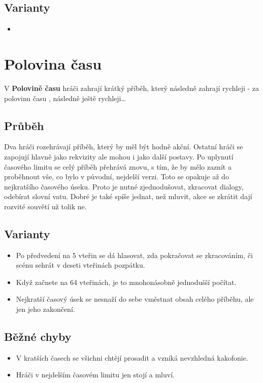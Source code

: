 \documentclass[main.tex]{subfiles}
\begin{document}
\subsection{Varianty} \begin{itemize}
\item {}
\end{itemize}
 
 
 
 
 
\needspace{5cm} \section{Polovina času} \label{polovina času}  
 
V \textbf{Polovině času}{} hráči zahrají krátký příběh, který následně zahrají rychleji -  za polovinu času , následně ještě rychleji… 
 
\subsection{ Průběh } Dva hráči rozehrávají příběh, který by měl být hodně akční. Ostatní hráči se zapojují hlavně jako rekvizity ale mohou i jako další postavy. Po uplynutí časového limitu se celý příběh přehrává znovu, s tím, že by mělo zaznít a proběhnout vše, co bylo v původní, nejdelší verzi. Toto se opakuje až do nejkratšího časového úseku. Proto je nutné zjednodušovat, zkracovat dialogy, odebírat slovní vatu. Dobré je také spíše jednat, než mluvit, akce se zkrátit dají rozvité souvětí už tolik ne. 
 
\subsection{ Varianty } \begin{itemize}
\item Po předvedení na 5 vteřin se dá hlasovat, zda pokračovat se zkracováním, či scénu sehrát v deseti vteřinách pozpátku.
\item Když začnete na 64 vteřinách, je to mnohonásobně jednodušší počítat.
\item Nejkratší časový úsek se nesnaží do sebe vměstnat obsah celého příběhu, ale jen jeho zakončení.
\end{itemize}
 
\subsection{ Běžné chyby } \begin{itemize}
\item V kratších časech se všichni chtějí prosadit a vzniká nevzhledná kakofonie.
\item Hráči v nejdelším časovém limitu jen stojí a mluví.
\end{itemize}
 
\end{document}
